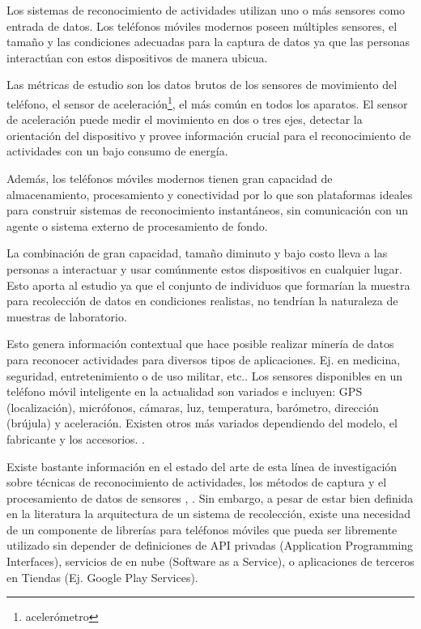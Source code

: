 \label{justificaciuxf3n}

Los sistemas de reconocimiento de actividades utilizan uno o más sensores
como entrada de datos. Los teléfonos móviles modernos poseen múltiples
sensores, el tamaño y las condiciones adecuadas para la captura de
datos ya que las personas interactúan con estos dispositivos de manera
ubicua. 

Las métricas de estudio son los datos brutos de los sensores de movimiento
del teléfono, el sensor de aceleración\footnote{acelerómetro}, el
más común en todos los aparatos. El sensor de aceleración puede medir
el movimiento en dos o tres ejes, detectar la orientación del dispositivo
y provee información crucial para el reconocimiento de actividades
con un bajo consumo de energía. 

Además, los teléfonos móviles modernos tienen gran capacidad de almacenamiento,
procesamiento y conectividad por lo que son plataformas ideales para
construir sistemas de reconocimiento instantáneos, sin comunicación
con un agente o sistema externo de procesamiento de fondo. 

La combinación de gran capacidad, tamaño diminuto y bajo costo lleva
a las personas a interactuar y usar comúnmente estos dispositivos
en cualquier lugar. Esto aporta al estudio ya que el conjunto de individuos
que formarían la muestra para recolección de datos en condiciones
realistas, no tendrían la naturaleza de muestras de laboratorio.

Esto genera información contextual que hace posible realizar minería
de datos para reconocer actividades para diversos tipos de aplicaciones.
Ej. en medicina, seguridad, entretenimiento o de uso militar, etc.\cite{LaraLabrador2013}.
Los sensores disponibles en un teléfono móvil inteligente en la actualidad
son variados e incluyen: GPS (localización), micrófonos, cámaras,
luz, temperatura, barómetro, dirección (brújula) y aceleración. Existen
otros más variados dependiendo del modelo, el fabricante y los accesorios.
.

Existe bastante información en el estado del arte de esta línea de
investigación sobre técnicas de reconocimiento de actividades, los
métodos de captura y el procesamiento de datos de sensores \cite{LaraLabrador2012},
\cite{Kwapisz2011}. Sin embargo, a pesar de estar bien definida en
la literatura la arquitectura de un sistema de recolección, existe
una necesidad de un componente de librerías para teléfonos móviles
que pueda ser libremente utilizado sin depender de definiciones de
API privadas (Application Programming Interfaces), servicios de en
nube (Software as a Service), o aplicaciones de terceros en Tiendas
(Ej. Google Play Services).

